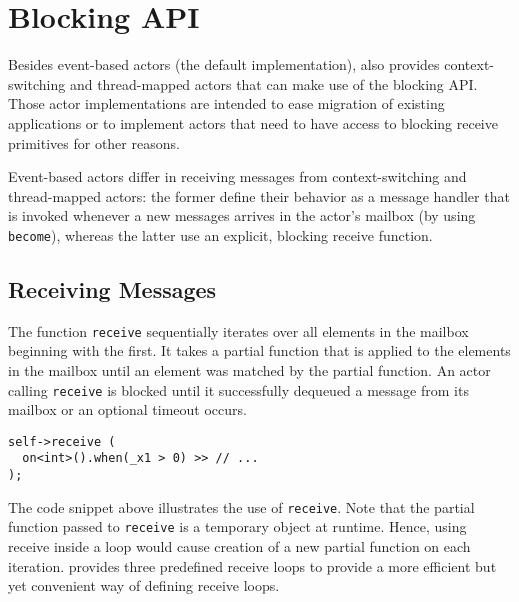 \section{Blocking API}
\label{Sec::BlockingAPI}

Besides event-based actors (the default implementation), \libcppa also provides context-switching and thread-mapped actors that can make use of the blocking API.
Those actor implementations are intended to ease migration of existing applications or to implement actors that need to have access to blocking receive primitives for other reasons.

Event-based actors differ in receiving messages from context-switching and thread-mapped actors: the former define their behavior as a message handler that is invoked whenever a new messages arrives in the actor's mailbox (by using \lstinline^become^), whereas the latter use an explicit, blocking receive function.

\subsection{Receiving Messages}

The function \lstinline^receive^ sequentially iterates over all elements in the mailbox beginning with the first.
It takes a partial function that is applied to the elements in the mailbox until an element was matched by the partial function.
An actor calling \lstinline^receive^ is blocked until it successfully dequeued a message from its mailbox or an optional timeout occurs.

\begin{lstlisting}
self->receive (
  on<int>().when(_x1 > 0) >> // ...
);
\end{lstlisting}

The code snippet above illustrates the use of \lstinline^receive^.
Note that the partial function passed to \lstinline^receive^ is a temporary object at runtime.
Hence, using receive inside a loop would cause creation of a new partial function on each iteration.
\libcppa provides three predefined receive loops to provide a more efficient but yet convenient way of defining receive loops.

